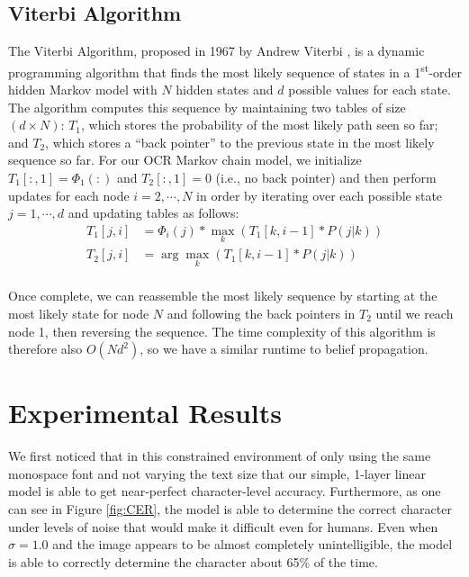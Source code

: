 \documentclass[10pt,twocolumn,letterpaper]{article}
\begin{document}
\subsection{Viterbi Algorithm}

The Viterbi Algorithm, proposed in 1967 by Andrew Viterbi \cite{Forney73-TVA},
is a dynamic programming algorithm that finds the most likely
sequence of states in a 1\textsuperscript{st}-order hidden Markov model
with $N$ hidden states and $d$ possible values for each state.
The algorithm computes this sequence by maintaining two tables of
size $(d \times N)$: $T_1$, which stores the probability of the most likely
path seen so far; and $T_2$, which stores a ``back pointer'' to the previous
state in the most likely sequence so far. For our OCR Markov chain model,
we initialize $T_1[:,1] = \Phi_1(:)$ and $T_2[:,1] = 0$ (i.e., no back
pointer) and then perform updates for each node $i = 2, \cdots, N$
in order by iterating over each possible state $j = 1, \cdots, d$ and
updating tables as follows:
\begin{equation}
\begin{split}
T_1[j, i] &= \Phi_i(j) * \max_k \left( T_1[k, i - 1] * P(j | k) \right) \\
T_2[j, i] &= \arg \max_k \left( T_1[k, i - 1] * P(j | k) \right) \\
\end{split}
\end{equation}

Once complete, we can reassemble the most likely sequence by starting
at the most likely state for node $N$ and following the back pointers
in $T_2$ until we reach node 1, then reversing the sequence. The time
complexity of this algorithm is therefore also $O(Nd^2)$, so we have
a similar runtime to belief propagation.



\section{Experimental Results}
\label{exp_results}
We first noticed that in this constrained environment of only using the
same monospace font and not varying the text size that our simple,
1-layer linear model is able to get near-perfect character-level accuracy.
Furthermore, as one can see in Figure \ref{fig:CER}, the model is able to
determine the correct character under levels of noise that would make it
difficult even for humans. Even when $\sigma = 1.0$ and the image appears
to be almost completely unintelligible, the model is able to correctly
determine the character about 65\% of the time. 
\end{document}
